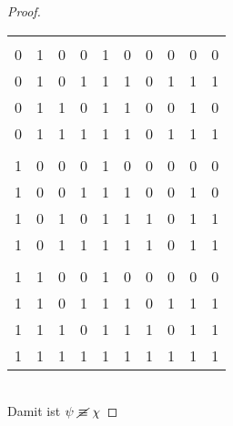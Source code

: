 \documentclass[a4paper,10pt]{article}
\begin{document}
\begin{compactenum} [(a)]
\begin{proof}
\begin{tabular}{cccc|c|c|c|c|c|c}
		   	&&&&&&&&&\\
		   	0 & 1 & 0 & 0 & 1 & 0 & 0 & 0 & 0 & 0\\
		   	0 & 1 & 0 & 1 & 1 & 1 & 0 & 1 & 1 & 1\\
		   	0 & 1 & 1 & 0 & 1 & 1 & 0 & 0 & 1 & 0\\
		   	0 & 1 & 1 & 1 & 1 & 1 & 0 & 1 & 1 & 1\\
		   	&&&&&&&&&\\
		   	1 & 0 & 0 & 0 & 1 & 0 & 0 & 0 & 0 & 0\\
		   	1 & 0 & 0 & 1 & 1 & 1 & 0 & 0 & 1 & 0\\
		   	1 & 0 & 1 & 0 & 1 & 1 & 1 & 0 & 1 & 1\\
		   	1 & 0 & 1 & 1 & 1 & 1 & 1 & 0 & 1 & 1\\
		   	&&&&&&&&&\\
		   	1 & 1 & 0 & 0 & 1 & 0 & 0 & 0 & 0 & 0\\
		   	1 & 1 & 0 & 1 & 1 & 1 & 0 & 1 & 1 & 1\\
		   	1 & 1 & 1 & 0 & 1 & 1 & 1 & 0 & 1 & 1\\
		   	1 & 1 & 1 & 1 & 1 & 1 & 1 & 1 & 1 & 1\\
		   \end{tabular}\\
			Damit ist $\psi \ \cancel{\equiv} \ \chi$
		\end{proof}
	\end{compactenum} \
\end{document}
